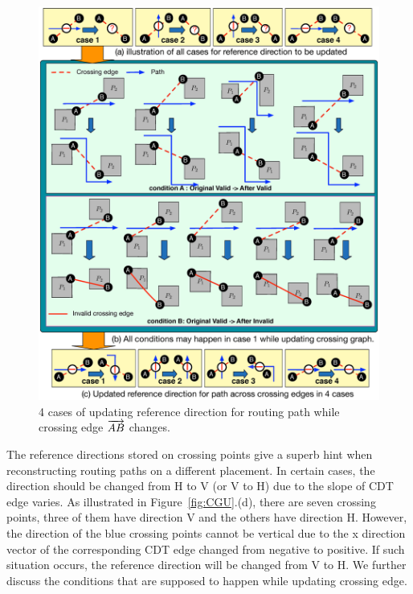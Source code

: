     \begin{figure}[t]
      \begin{center}
        \includegraphics[width=\textwidth]{Fig/dirch.eps}
        \caption{4 cases of updating reference direction for routing path while crossing edge $\protect\overrightarrow{AB}$ changes.}
        \label{fig:dirch}
      \end{center}
    \end{figure}

    The reference directions stored on crossing points give a superb hint when reconstructing routing paths on a different placement.
    In certain cases, the direction should be changed from H to V (or V to H) due to the slope of CDT edge varies. As illustrated in Figure~\ref{fig:CGU}.(d), there are seven crossing points, three of them have direction V and the others have direction H. However, the direction of the blue crossing points cannot be vertical due to the x direction vector of the corresponding CDT edge changed from negative to positive. If such situation occurs, the reference direction will be changed from V to H. We further discuss the conditions that are supposed to happen while updating crossing edge.


